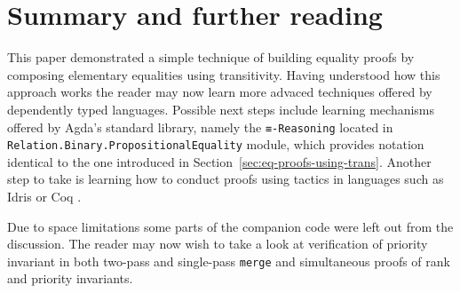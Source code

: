 \section{Summary and further reading}

This paper demonstrated a simple technique of building equality proofs by composing elementary equalities using transitivity. Having understood how this approach works the reader may now learn more advaced techniques offered by dependently typed languages. Possible next steps include learning mechanisms offered by Agda's standard library, namely the \texttt{≡-Reasoning} located in \texttt{Relation.}\texttt{Binary.}\texttt{PropositionalEquality} module, which provides notation identical to the one introduced in Section~\ref{sec:eq-proofs-using-trans}. Another step to take is learning how to conduct proofs using tactics in languages such as Idris \cite{Bra13} or Coq \cite{coq}.

Due to space limitations some parts of the companion code were left out from the discussion. The reader may now wish to take a look at verification of priority invariant in both two-pass and single-pass \texttt{merge} and simultaneous proofs of rank and priority invariants.
